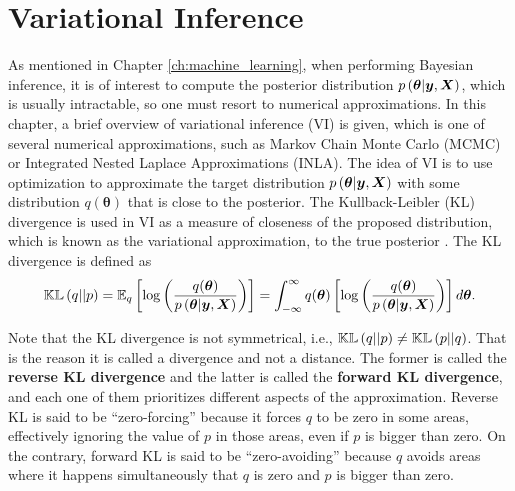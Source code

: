 
\chapter{Variational Inference}
\label{ch:variational_inference}



As mentioned in Chapter \ref{ch:machine_learning}, when performing Bayesian inference, it is of interest to compute the posterior distribution $p\left( \boldsymbol{\theta} | \boldsymbol{y}, \boldsymbol{X} \right)$, which is usually intractable, so one must resort to numerical approximations. In this chapter, a brief overview of variational inference (VI) is given, which is one of several numerical approximations, such as Markov Chain Monte Carlo (MCMC) or Integrated Nested Laplace Approximations (INLA). The idea of VI is to use optimization to approximate the target distribution $p\left( \boldsymbol{\theta} | \boldsymbol{y}, \boldsymbol{X} \right)$ with some distribution $q(\boldsymbol{\theta})$ that is close to the posterior. The Kullback-Leibler (KL) divergence is used in VI as a measure of closeness of the proposed distribution, which is known as the variational approximation, to the true posterior \cite{blei2017variational}. The KL divergence is defined as
\begin{equation}
  \label{eq:kl_divergence}
  \mathbb{KL}\left( q || p \right) = \mathbb{E}_q \left[ \log \left( \frac{q(\boldsymbol{\theta})}{p\left( \boldsymbol{\theta} | \boldsymbol{y}, \boldsymbol{X} \right)} \right) \right] = \int_{-\infty}^{\infty} q(\boldsymbol{\theta}) \left[ \log \left( \frac{q(\boldsymbol{\theta})}{p\left( \boldsymbol{\theta} | \boldsymbol{y}, \boldsymbol{X} \right)} \right) \right] d\boldsymbol{\theta}.
\end{equation}

Note that the KL divergence is not symmetrical, i.e., $\mathbb{KL}\left( q || p \right) \neq \mathbb{KL}\left( p || q \right)$. That is the reason it is called a divergence and not a distance. The former is called the \textbf{reverse KL divergence} and the latter is called the \textbf{forward KL divergence}, and each one of them prioritizes different aspects of the approximation. Reverse KL is said to be ``zero-forcing'' because it forces $q$ to be zero in some areas, effectively ignoring the value of $p$ in those areas, even if $p$ is bigger than zero. On the contrary, forward KL is said to be ``zero-avoiding'' because $q$ avoids areas where it happens simultaneously that $q$ is zero and $p$ is bigger than zero.

